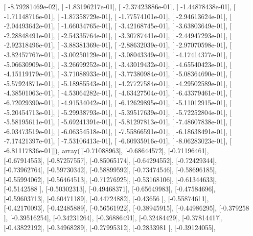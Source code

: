 \documentclass{article}
\begin{document}
       [ -8.79281469e-02],
       [ -1.83196217e-01],
       [ -2.37423886e-01],
       [ -1.44878438e-01],
       [ -1.71148716e-01],
       [ -1.87358729e-01],
       [ -1.77574101e-01],
       [ -2.94613624e-01],
       [ -2.04493642e-01],
       [ -1.66034765e-01],
       [ -3.42168745e-01],
       [ -3.63803649e-01],
       [ -2.28848491e-01],
       [ -2.54335764e-01],
       [ -3.30787441e-01],
       [ -2.44947293e-01],
       [ -2.92318496e-01],
       [ -3.88381369e-01],
       [ -2.88632039e-01],
       [ -2.97070598e-01],
       [ -3.82457767e-01],
       [ -3.00250129e-01],
       [ -3.08043349e-01],
       [ -4.17414377e-01],
       [ -5.06630909e-01],
       [ -3.26699252e-01],
       [ -3.43019432e-01],
       [ -4.65540423e-01],
       [ -4.15119179e-01],
       [ -3.71088933e-01],
       [ -3.77380984e-01],
       [ -5.08364690e-01],
       [ -5.57924871e-01],
       [ -5.18985543e-01],
       [ -4.27727584e-01],
       [ -4.29502589e-01],
       [ -4.38501063e-01],
       [ -4.53064282e-01],
       [ -4.63427504e-01],
       [ -6.43379461e-01],
       [ -6.72029390e-01],
       [ -4.91534042e-01],
       [ -6.12629895e-01],
       [ -5.11012915e-01],
       [ -5.20454713e-01],
       [ -5.29938793e-01],
       [ -5.39517639e-01],
       [ -5.72252804e-01],
       [ -5.58195611e-01],
       [ -5.69241391e-01],
       [ -5.81297813e-01],
       [ -7.48607838e-01],
       [ -6.03473519e-01],
       [ -6.06354518e-01],
       [ -7.55866591e-01],
       [ -6.18638491e-01],
       [ -7.17421397e-01],
       [ -7.53106413e-01],
       [ -6.60935916e-01],
       [ -8.06283023e-01],
       [ -6.81117836e-01]]), array([[-0.71088963],
       [-0.68644572],
       [-0.71196461],
       [-0.67914553],
       [-0.87257557],
       [-0.85065174],
       [-0.64294552],
       [-0.72429344],
       [-0.73962764],
       [-0.59730342],
       [-0.58899592],
       [-0.73474546],
       [-0.58696185],
       [-0.55994062],
       [-0.56464513],
       [-0.71276925],
       [-0.53168106],
       [-0.61344633],
       [-0.5142588 ],
       [-0.50302313],
       [-0.49468371],
       [-0.65649983],
       [-0.47584696],
       [-0.59603713],
       [-0.60471189],
       [-0.44724882],
       [-0.43656   ],
       [-0.55874611],
       [-0.42170093],
       [-0.42485889],
       [-0.56561922],
       [-0.38945915],
       [-0.44986295],
       [-0.379258  ],
       [-0.39516254],
       [-0.34231264],
       [-0.36886491],
       [-0.32484429],
       [-0.37814417],
       [-0.43822192],
       [-0.34968289],
       [-0.27995312],
       [-0.2833981 ],
       [-0.39124055],
\end{document}

